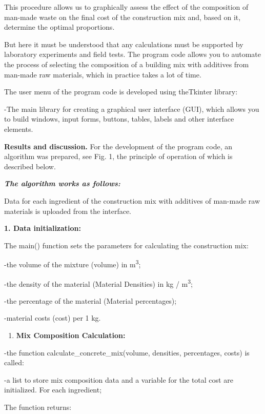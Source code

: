 \begin{multicols}{2}
This procedure allows us to graphically assess the effect of the
composition of man-made waste on the final cost of the construction mix
and, based on it, determine the optimal proportions.

But here it must be understood that any calculations must be supported
by laboratory experiments and field tests. The program code allows you
to automate the process of selecting the composition of a building mix
with additives from man-made raw materials, which in practice takes a
lot of time.

The user menu of the program code is developed using theTkinter library:

-The main library for creating a graphical user interface (GUI), which
allows you to build windows, input forms, buttons, tables, labels and
other interface elements.

{\bfseries Results and discussion.} For the development of the program
code, an algorithm was prepared, see Fig. 1, the principle of operation
of which is described below.

\emph{{\bfseries The algorithm works as follows:}}

Data for each ingredient of the construction mix with additives of
man-made raw materials is uploaded from the interface.

{\bfseries 1. Data initialization:}

The main() function sets the parameters for calculating the construction
mix:

-the volume of the mixture (volume) in m\textsuperscript{3};

-the density of the material (Material Densities) in kg /
m\textsuperscript{3};

-the percentage of the material (Material percentages);

-material costs (cost) per 1 kg.

\begin{enumerate}
\def\labelenumi{\arabic{enumi}.}
\setcounter{enumi}{1}
\item
  {\bfseries Mix Composition Calculation:}
\end{enumerate}

-the function calculate\_concrete\_mix(volume, densities, percentages,
costs) is called:

-a list to store mix composition data and a variable for the total cost
are initialized. For each ingredient;

The function returns:


\end{multicols}
